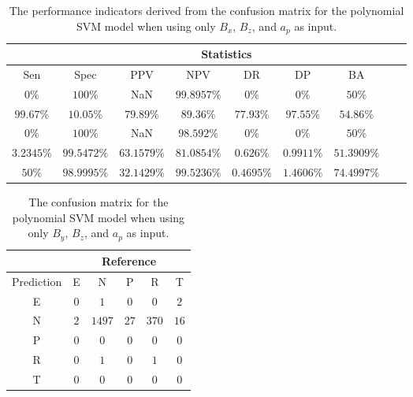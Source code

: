 \begin{table}[!ht]
	\centering
	\begin{tabular}{|c|c|c|c|c|c|c|c|c|}
		\hline
		 & \multicolumn{7}{c|}{Statistics} \\ \hline
		Sen & Spec & PPV & NPV & DR & DP & BA \\ \hline
		$0\%$ & $100\%$ & NaN & $99.8957\%$ & $0\%$ & $0\%$ & $50\%$ \\ \hline
		$99.67\%$ & $10.05\%$ & $79.89\%$ & $89.36\%$ & $77.93\%$ & $97.55\%$ & $54.86\%$ \\ \hline
		$0\%$ & $100\%$ & NaN & $98.592\%$ & $0\%$ & $0\%$ & $50\%$ \\ \hline
		$3.2345\%$ & $99.5472\%$ & $63.1579\%$ & $81.0854\%$ & $0.626\%$ & $0.9911\%$ & $51.3909\%$ \\ \hline
		$50\%$ & $98.9995\%$ & $32.1429\%$ & $99.5236\%$ & $0.4695\%$ & $1.4606\%$ & $74.4997\%$ \\ \hline
	\end{tabular}
	\caption{The performance indicators derived from the confusion matrix for the polynomial SVM model when using only $B_{x}$, $B_{z}$, and $a_{p}$ as input.}
	\label{tab:cs:xzap:svmPoly}
\end{table}

\begin{table}[!ht]
	\centering
	\begin{tabular}{|c|c|c|c|c|c|}
		\hline
		 & \multicolumn{5}{|c|}{Reference} \\ \hline
		 Prediction & E & N & P & R & T \\ \hline
		 E & $0$ & $1$ & $0$ & $0$ & $2$ \\ \hline
		 N & $2$ & $1497$ & $27$ & $370$ & $16$ \\ \hline
		 P & $0$ & $0$ & $0$ & $0$ & $0$ \\ \hline
		 R & $0$ & $1$ & $0$ & $1$ & $0$ \\ \hline
		 T & $0$ & $0$ & $0$ & $0$ & $0$ \\ \hline
	\end{tabular}
	\caption{The confusion matrix for the polynomial SVM model when using only $B_{y}$, $B_{z}$, and $a_{p}$ as input.}
	\label{tab:cm:yzap:svmPoly}
\end{table}


